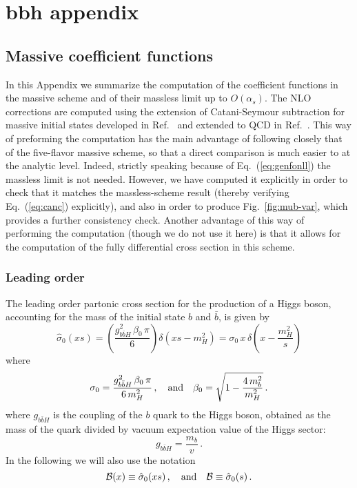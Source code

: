 \chapter{bbh appendix}
\section{Massive coefficient functions}
\label{sec:app-coeff}
In this Appendix we summarize  the computation of the
coefficient functions in the massive scheme and of their massless
limit up to $O(\alpha_s)$. The NLO corrections are computed using
the extension of
Catani-Seymour subtraction for massive initial states developed
in Ref.~\cite{Dittmaier:1999mb} and extended to QCD
in Ref.~\cite{Krauss:2017wmx}. This way of preforming the computation 
has the main advantage of following closely that of the
five-flavor massive scheme, so that a direct comparison is much easier to
at the analytic level. Indeed, strictly speaking because of
Eq.~(\ref{eq:genfonll}) the massless limit is not needed. However, we
have computed it explicitly in order to check that it matches the
massless-scheme result (thereby verifying Eq.~(\ref{eq:canc})
explicitly), and also in order to produce Fig.~\ref{fig:mub-var},
which provides a further consistency check. Another advantage of this
way of performing the computation (though we do not use it here) is
that it allows for the computation of
the fully differential cross section in this scheme. 

\subsection{Leading order}
The leading order partonic cross section for the production of a Higgs
boson, accounting for the mass of the initial state $b$ and $\bar{b}$,
is given by
\begin{equation}
  \label{eq:bbh-lo}
  \hat{\sigma}_{0}(xs) = \left( \frac{g_{b\bar{b}H}^2\,\beta_0\,\pi}{6}
  \right)\delta(xs -m_H^2) = \sigma_0 \,x\,\delta\left( x-\frac{m_H^2}{s} \right)
\end{equation}
where 
\begin{equation}
  \label{eq:s0}
  \sigma_0 = \frac{g_{b\bar{b}H}^2 \,\beta_0 \, \pi}{6\,m_H^2}\,,
  \quad {\rm and}\quad  \beta_0 = \sqrt{1-\frac{4\,m_b^2}{m_H^2}}\,.
\end{equation}
where $g_{b\bar{b}H}$ is the coupling of the $b$ quark to the Higgs
boson, obtained as the mass of the quark divided by vacuum expectation
value of the Higgs sector:
\begin{equation}
  g_{b\bar{b}H} = \frac{m_b}{v}\,.
\end{equation}
In the following we will also use the notation
\begin{equation}
  {\cal B}(x) \equiv \hat{\sigma}_{0}(xs)\,,\quad {\rm and} \quad
  {\cal B} \equiv \hat{\sigma}_{0}(s)\,.
\end{equation}

